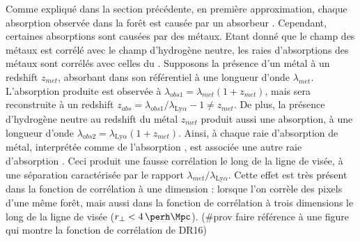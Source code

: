 \documentclass[11pt, twoside, a4paper, openright]{report}
\begin{document}
Comme expliqué dans la section précédente, en première approximation, chaque absorption observée dans la forêt \lya{} est causée par un absorbeur \lya{}. Cependant, certaines absorptions sont causées par des métaux.
Etant donné que le champ des métaux est corrélé avec le champ d'hydrogène neutre, les raies d'absorptions des métaux sont corrélés avec celles du \lya. Supposons la présence d'un métal à un redshift $z_{met}$, absorbant dans son référentiel à une longueur d'onde $\lambda_{met}$. L'absorption produite est observée à $\lambda_{obs1} = \lambda_{met} ( 1 + z_{met})$, mais sera reconstruite à un redshift $z_{abs} = \lambda_{obs1} / \lambda_{\mathrm{Ly}\alpha} - 1 \neq z_{met}$. De plus, la présence d'hydrogène neutre au redshift du métal $z_{met}$ produit aussi une absorption, à une longueur d'onde $\lambda_{obs2} = \lambda_{\mathrm{Ly}\alpha}(1+z_{met})$. Ainsi, à chaque raie d'absorption de métal, interprétée comme de l'absorption \lya{}, est associée une autre raie d'absorption \lya{}. Ceci produit une fausse corrélation le long de la ligne de visée, à une séparation caractérisée par le rapport $\lambda_{met} / \lambda_{\mathrm{Ly}\alpha}$. Cette effet est très présent dans la fonction de corrélation à une dimension : lorsque l'on corrèle des pixels d'une même forêt, mais aussi dans la fonction de corrélation à trois dimensions le long de la ligne de visée ($\rperp{} < \SI{4}{\perh\Mpc}$). (\#prov faire référence à une figure qui montre la fonction de corrélation de DR16)
\end{document}
